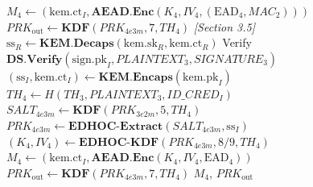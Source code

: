 \documentclass{easychair}
\begin{document}
\begin{algorithm}[H]
\begin{algorithmic}[1]
\State $M_4 \gets (\mathrm{kem.ct}_I, \mathbf{AEAD.Enc}(K_4, IV_4, (\mathrm{EAD}_4, MAC_2)))$
\State $PRK_{\mathrm{out}} \gets \mathbf{KDF}(PRK_{4e3m}, 7, TH_4)$
\Statex \textit{[Section 3.5]} 
\State $\mathrm{ss}_R \gets \mathbf{KEM.Decaps}(\mathrm{kem.sk}_R, \mathrm{kem.ct}_R)$
\State Verify $\mathbf{DS.Verify}(\mathrm{sign.pk}_I, PLAINTEXT_3, SIGNATURE_3)$
\State $(\mathrm{ss}_I, \mathrm{kem.ct}_I) \gets \mathbf{KEM.Encaps}(\mathrm{kem.pk}_I)$
\State $TH_4 \gets H(TH_3, PLAINTEXT_3, ID\_CRED_I)$
\State $SALT_{4e3m} \gets \mathbf{KDF}(PRK_{3e2m}, 5, TH_4)$
\State $PRK_{4e3m} \gets \mathbf{EDHOC\text{-}Extract}(SALT_{4e3m}, \mathrm{ss}_I)$
\State $(K_4, IV_4) \gets \mathbf{EDHOC\text{-}KDF}(PRK_{4e3m}, 8\text{/}9, TH_4)$
\State $M_4 \gets (\mathrm{kem.ct}_I, \mathbf{AEAD.Enc}(K_4, IV_4, \mathrm{EAD}_4))$
\State $PRK_{\mathrm{out}} \gets \mathbf{KDF}(PRK_{4e3m}, 7, TH_4)$
\State \Return $M_4$, $PRK_{\mathrm{out}}$
\end{algorithmic}
\end{algorithm}
\end{document}
